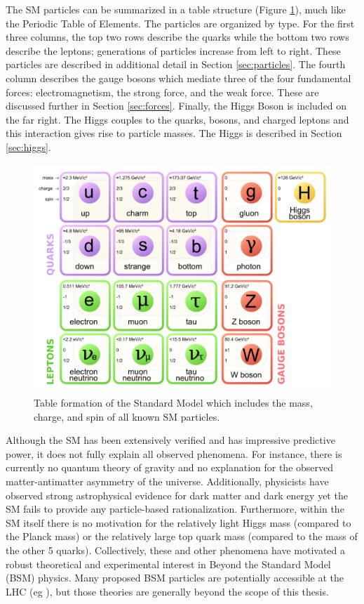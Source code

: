 The SM particles can be summarized in a table structure (Figure \ref{fig:sm_table}), much like the Periodic Table of Elements. The particles are organized by type. For the first three columns, the top two rows describe the quarks while the bottom two rows describe the leptons; generations of particles increase from left to right. These particles are described in additional detail in Section \ref{sec:particles}. The fourth column describes the gauge bosons which mediate three of the four fundamental forces: electromagnetism, the strong force, and the weak force. These are discussed further in Section \ref{sec:forces}. Finally, the Higgs Boson is included on the far right. The Higgs couples to the quarks, bosons, and charged leptons and this interaction gives rise to particle masses. The Higgs is described in Section \ref{sec:higgs}.\\

\begin{figure}[h]
    \centering
    \includegraphics[width=5in]{figures/chapter1/sm.png}
    \caption{Table formation of the Standard Model which includes the mass, charge, and spin of all known SM particles.}
    \label{fig:sm_table}
\end{figure}

Although the SM has been extensively verified and has impressive predictive power, it does not fully explain all observed phenomena. For instance, there is currently no quantum theory of gravity and no explanation for the observed matter-antimatter asymmetry of the universe. Additionally, physicists have observed strong astrophysical evidence for dark matter \cite{dm_summary} and dark energy \cite{de_summary} yet the SM fails to provide any particle-based rationalization. Furthermore, within the SM itself there is no motivation for the relatively light Higgs mass (compared to the Planck mass) or the relatively large top quark mass (compared to the mass of the other 5 quarks). Collectively, these and other phenomena have motivated a robust theoretical and experimental interest in Beyond the Standard Model (BSM) physics. Many proposed BSM particles are potentially accessible at the LHC (eg \cite{bsm_hllhc}), but those theories are generally beyond the scope of this thesis.

